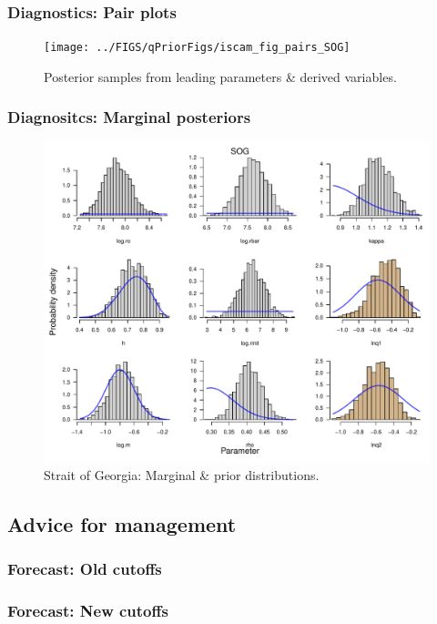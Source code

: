 %
\begin{frame}[t]\frametitle{Diagnostics: Pair plots}
	\begin{figure}[htbp]
		\centering
		\vspace{-0.75cm}	\texttt{[image: ../FIGS/qPriorFigs/iscam\_fig\_pairs\_SOG]}
		\vspace{-0.65cm}
		\caption{Posterior samples from leading parameters \& derived variables.}
	\end{figure}
\end{frame}
%
\begin{frame}[t]\frametitle{Diagnositcs: Marginal posteriors}
	\begin{figure}[htbp]
		\centering
			\includegraphics[scale=0.4]{../FIGS/qPriorFigs/iscam_fig_marginals_SOG}
		\caption{Strait of Georgia: Marginal \& prior distributions.}
	\end{figure}
\end{frame}

\subsection{Advice for management} %
\label{sub:advice_for_management}
%
\begin{frame}[t,shrink=35]\frametitle{Forecast: Old cutoffs}
	
\end{frame}
%
\begin{frame}[t,shrink=35]\frametitle{Forecast: New cutoffs}
	
\end{frame}

